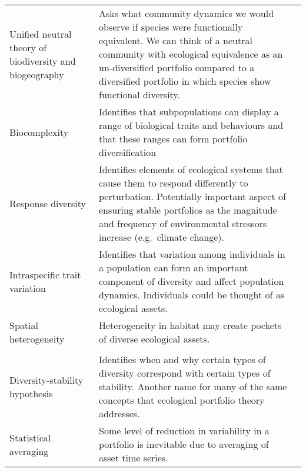 \begin{small}
\begin{longtable}{>{\RaggedRight}p{3.6cm}>{\RaggedRight}p{7.3cm}>{\RaggedRight}p{3.6cm}}
Unified neutral theory of biodiversity and biogeography &
Asks what community dynamics we would observe if species were functionally equivalent. We can think of a neutral community with ecological equivalence as an un-diversified portfolio compared to a diversified portfolio in which species show functional diversity. &
\citep{hubbell2001}\\

Biocomplexity &
Identifies that subpopulations can display a range of biological traits and behaviours and that these ranges can form portfolio diversification &
\citep{hilborn2003, hutchinson2008}\\

Response diversity &
Identifies elements of ecological systems that cause them to respond differently to perturbation. Potentially important aspect of ensuring stable portfolios as the magnitude and frequency of environmental stressors increase (e.g.\ climate change). &
\citep{elmqvist2003, loreau2008, loreau2013}\\

Intraspecific trait variation &
Identifies that variation among individuals in a population can form an important component of diversity and affect population dynamics. Individuals could be thought of as ecological assets. &
\citep{bolnick2011}\\

Spatial heterogeneity &
Heterogeneity in habitat may create pockets of diverse ecological assets. &
\citep{oliver2010,parn2012,mccluney2014}\\



\midrule
\multicolumn{2}{l}{\textbf{Risk-reduction consequences of diversity}}\\
\midrule

Diversity-stability hypothesis &
Identifies when and why certain types of diversity correspond with certain types of stability. Another name for many of the same concepts that ecological portfolio theory addresses.  &
\citep{ives2007, loreau2013}\\

Statistical averaging &
Some level of reduction in variability in a portfolio is inevitable due to averaging of asset time series. &
\citep{doak1998}\\


\end{longtable}
\end{small}
